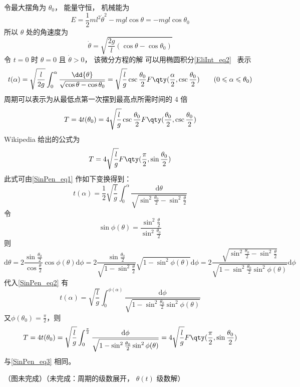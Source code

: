 

令最大摆角为 $\theta_0$， 能量守恒， 机械能为
\begin{equation}
E = \frac{1}{2} m l^2 \dot \theta^2 - mg l \cos\theta = - mg l \cos\theta_0
\end{equation}
所以 $\theta$ 处的角速度为
\begin{equation}
\dot{\theta} = \sqrt{\frac{2g}{l} (\cos\theta - \cos\theta_0) }
\end{equation}
令 $t = 0$ 时 $\theta = 0$ 且 $\dot{\theta} > 0$， 该微分方程的解%
可以用椭圆积分\autoref{EliInt_eq2}~ 表示
\begin{equation}\label{SinPen_eq1}
t(\alpha) = \sqrt{\frac{l}{2g}} \int_0^{\alpha} \frac{\dd{\theta}}{\sqrt{\cos\theta - \cos\theta_0}}
= \sqrt{\frac{l}{g}} \csc\frac{\theta_0}{2} F\qty(\frac{\alpha}{2}, \csc\frac{\theta_0}{2})
\qquad (0 \leqslant \alpha \leqslant \theta_0)
\end{equation}
周期可以表示为从最低点第一次摆到最高点所需时间的 4 倍
\begin{equation}
T = 4t(\theta_0) = 4 \sqrt{\frac{l}{g}} \csc\frac{\theta_0}{2} F\qty(\frac{\theta_0}{2}, \csc\frac{\theta_0}{2})
\end{equation}
Wikipedia 给出的公式为
\begin{equation}\label{SinPen_eq3}
T = 4 \sqrt{\frac{l}{g}} F\qty(\frac{\pi}{2}, \sin\frac{\theta_0}{2})
\end{equation}
此式可由\autoref{SinPen_eq1} 作如下变换得到：
\begin{equation}\label{SinPen_eq2}
t(\alpha)=\frac12\sqrt{\frac{l}{g}}\int_{0}^{\alpha}\frac{\mathrm{d}\theta}{\sqrt{\sin^2\frac{\theta_0}2-\sin^2\frac{\theta}2}}
\end{equation}
令
\begin{equation}
\sin \phi(\theta)=\frac{\sin^2\frac{\theta}2}{\sin^2\frac{\theta_0}2}
\end{equation}
则
\begin{equation}
\mathrm d\theta=2\frac{\sin\frac{\theta_0}2}{\cos\frac{\theta}2}\cos\phi(\theta)\mathrm d\phi
=2\frac{\sin\frac{\theta_0}2}{\sqrt{1-\sin^2\frac{\theta}2}}\sqrt{1-\sin^2\phi(\theta)}\mathrm d\phi
=2\frac{\sqrt{\sin^2\frac{\theta_0}2-\sin^2\frac{\theta}2}}{\sqrt{1-\sin^2\frac{\theta_0}2\sin^2{\phi(\theta)}}}\mathrm d\phi
\end{equation}
代入\autoref{SinPen_eq2} 有
\begin{equation}
t(\alpha)=\sqrt{\frac{l}{g}}\int_{0}^{\phi(\alpha)}\frac{\mathrm{d}\phi}{\sqrt{1-\sin^2\frac{\theta_0}2\sin^2{\phi(\theta)}}}
\end{equation}
又$\phi(\theta_0)=\frac\pi2$，则
\begin{equation}
T=4t(\theta_0)=\sqrt{\frac{l}{g}}\int_{0}^{\frac\pi2}\frac{\mathrm{d}\phi}{\sqrt{1-\sin^2\frac{\theta_0}2\sin^2{\phi(\theta)}}}=4 \sqrt{\frac{l}{g}} F\qty(\frac{\pi}{2}, \sin\frac{\theta_0}{2})
\end{equation}
与\autoref{SinPen_eq3} 相同。


（图未完成）（未完成：周期的级数展开， $\theta(t)$ 级数解）
